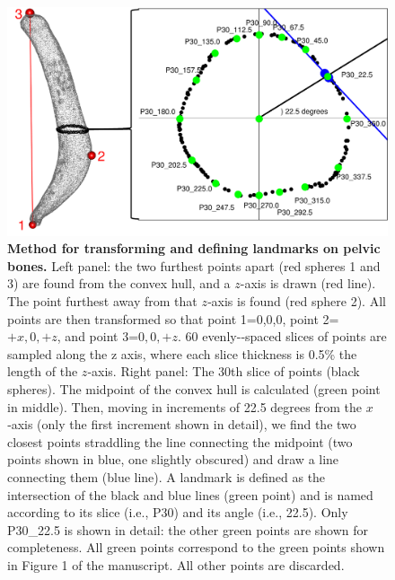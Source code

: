 \documentclass[12pt]{article}
\begin{document}

\begin{figure}
\begin{center}
  \includegraphics[width=\textwidth]{S2}
\end{center}
\caption{
\small
\textbf{Method for transforming and defining landmarks on pelvic bones.} Left panel: the two furthest points apart (red spheres 1 and 3) 
are found from the convex hull, and a $z$-axis is drawn (red line). The point furthest away from that $z$‐axis is found (red sphere 2). All points are then transformed 
so that point 1=0,0,0, point 2=$+x,0,+z$, and point 3=$0,0,+z$. 60 evenly-‐spaced slices of points are sampled along the z axis, where each slice thickness is 0.5\% the 
length of the $z$‐axis. Right panel: The 30th slice of points (black spheres). The midpoint of the convex hull is calculated (green point in middle). Then, moving in 
increments of 22.5 degrees from the $x$‐axis (only the first increment shown in detail), we find the two closest points straddling the line connecting the midpoint 
(two points shown in blue, one slightly obscured) and draw a line connecting them (blue line). A landmark is defined as the intersection of the black and blue 
lines (green point) and is named according to its slice (i.e., P30) and its angle (i.e., 22.5). Only P30\_22.5 is shown in detail: the other green points are shown for 
completeness. All green points correspond to the green points shown in Figure 1 of the manuscript. All other points are discarded. 
}
\end{figure}
\end{document}
